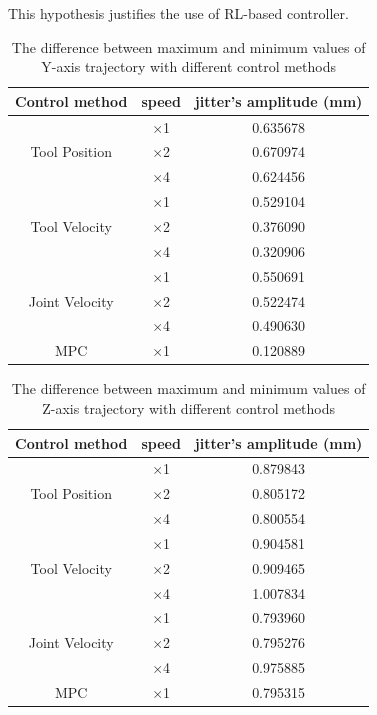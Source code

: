This hypothesis justifies the use of \ac {RL}-based controller.

\begin{table}[h]
	\centering
	\caption{The difference between maximum and minimum values of Y-axis trajectory with different control methods}
	\begin{tabular}{|c|c|c|}
		\hline
		Control method & speed & jitter's amplitude (mm) \\
		\hline		
		& $ \times $1 & 0.635678\\
		Tool Position & $ \times $2 & 0.670974\\
		& $ \times $4 & 0.624456\\
		\hline		
		& $ \times $1 & 0.529104\\
		Tool Velocity & $ \times $2 & 0.376090\\
		& $ \times $4 & 0.320906\\
		\hline		
		& $ \times $1 & 0.550691\\
		Joint Velocity & $ \times $2 & 0.522474\\
		& $ \times $4 & 0.490630\\				
		\hline
		\ac {MPC} & $ \times $1 & 0.120889 \\
		\hline

	\end{tabular}
	\label{tab:y_jitter}
\end{table}

\begin{table}
	\centering
	\caption{The difference between maximum and minimum values of Z-axis trajectory with different control methods}
	\begin{tabular}{|c|c|c|}
		\hline
		Control method & speed & jitter's amplitude (mm) \\
		\hline		
		& $ \times $1 & 0.879843\\
		Tool Position & $ \times $2 & 0.805172\\
		& $ \times $4 & 0.800554\\
		\hline		
		& $ \times $1 & 0.904581\\
		Tool Velocity & $ \times $2 & 0.909465\\
		& $ \times $4 & 1.007834\\
		\hline		
		& $ \times $1 & 0.793960\\
		Joint Velocity & $ \times $2 & 0.795276\\
		& $ \times $4 & 0.975885\\				
		\hline
		\ac {MPC} & $ \times $1 & 0.795315 \\
		\hline
		
	\end{tabular}
	\label{tab:z_jitter}
\end{table}

